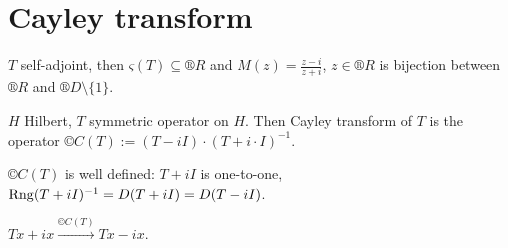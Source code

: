 \documentclass[12pt]{article}					%
\begin{document}
\section{Cayley transform}
\begin{poznamka}[Motivation]
	$T$ self-adjoint, then $ς(T) \subseteq ®R$ and $M(z) = \frac{z - i}{z + i}$, $z \in ®R$ is bijection between $®R$ and $®D \setminus \{1\}$.
\end{poznamka}

\begin{definice}
	$H$ Hilbert, $T$ symmetric operator on $H$. Then Cayley transform of $T$ is the operator $©C(T) := (T - iI)·(T + i·I)^{-1}$.

	\begin{poznamkain}
		$©C(T)$ is well defined: $T + iI$ is one-to-one, $\operatorname{Rng}(T + iI)^{-1} = D(T + iI) = D(T - iI)$.

		$Tx + ix \overset{©C(T)}\rightarrow Tx - ix$.
	\end{poznamkain}
\end{definice}
\end{document}
